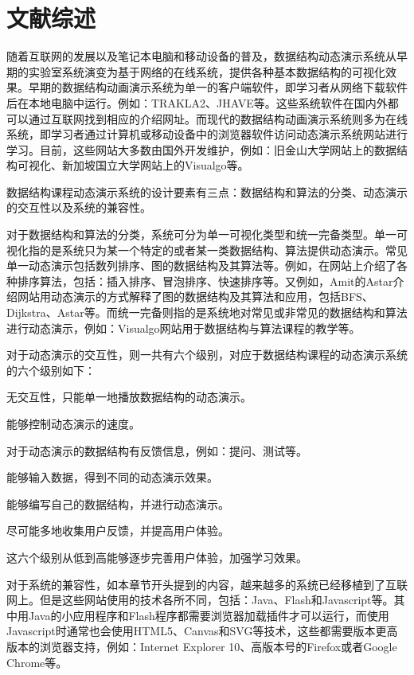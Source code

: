 \chapter{文献综述}
\begin{chatext}
随着互联网的发展以及笔记本电脑和移动设备的普及，数据结构动态演示系统从早期的实验室系统演变为基于网络的在线系统，提供各种基本数据结构的可视化效果。早期的数据结构动画演示系统为单一的客户端软件，即学习者从网络下载软件后在本地电脑中运行。例如：TRAKLA2、JHAVE等。这些系统软件在国内外都可以通过互联网找到相应的介绍网址。而现代的数据结构动画演示系统则多为在线系统，即学习者通过计算机或移动设备中的浏览器软件访问动态演示系统网站进行学习。目前，这些网站大多数由国外开发维护，例如：旧金山大学网站上的数据结构可视化、新加坡国立大学网站上的Visualgo等。

数据结构课程动态演示系统的设计要素有三点：数据结构和算法的分类、动态演示的交互性以及系统的兼容性。

对于数据结构和算法的分类，系统可分为单一可视化类型和统一完备类型。单一可视化指的是系统只为某一个特定的或者某一类数据结构、算法提供动态演示。常见单一动态演示包括数列排序、图的数据结构及其算法等。例如，在网站上介绍了各种排序算法，包括：插入排序、冒泡排序、快速排序等。又例如，Amit的Astar介绍网站用动态演示的方式解释了图的数据结构及其算法和应用，包括BFS、Dijkstra、Astar等。而统一完备则指的是系统地对常见或非常见的数据结构和算法进行动态演示，例如：Visualgo网站用于数据结构与算法课程的教学等。

对于动态演示的交互性，则一共有六个级别，对应于数据结构课程的动态演示系统的六个级别如下：
\begin{itemlist}
\item 无交互性，只能单一地播放数据结构的动态演示。
\item 能够控制动态演示的速度。
\item 对于动态演示的数据结构有反馈信息，例如：提问、测试等。
\item 能够输入数据，得到不同的动态演示效果。
\item 能够编写自己的数据结构，并进行动态演示。
\item 尽可能多地收集用户反馈，并提高用户体验。
\end{itemlist}

这六个级别从低到高能够逐步完善用户体验，加强学习效果。

对于系统的兼容性，如本章节开头提到的内容，越来越多的系统已经移植到了互联网上。但是这些网站使用的技术各所不同，包括：Java、Flash和Javascript等。其中用Java的小应用程序和Flash程序都需要浏览器加载插件才可以运行，而使用Javascript时通常也会使用HTML5、Canvas和SVG等技术，这些都需要版本更高版本的浏览器支持，例如：Internet Explorer 10、高版本号的Firefox或者Google Chrome等。
\end{chatext}
